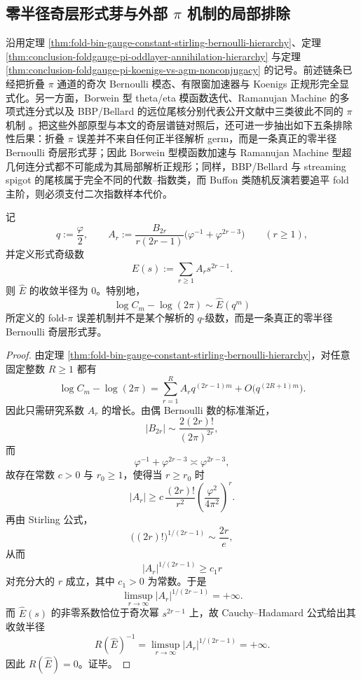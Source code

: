 \subsection{零半径奇层形式芽与外部 \texorpdfstring{$\pi$}{pi} 机制的局部排除}\label{subsec:conclusion-foldgauge-pi-zero-radius-external-obstruction}
沿用定理 \ref{thm:fold-bin-gauge-constant-stirling-bernoulli-hierarchy}、定理 \ref{thm:conclusion-foldgauge-pi-oddlayer-annihilation-hierarchy} 与定理 \ref{thm:conclusion-foldgauge-pi-koenigs-vs-agm-nonconjugacy} 的记号。前述链条已经把折叠 \(\pi\) 通道的奇次 Bernoulli 模态、有限窗加速器与 Koenigs 正规形完全显式化。另一方面，Borwein 型 theta/eta 模函数迭代、Ramanujan Machine 的多项式连分式以及 BBP/Bellard 的远位尾核分别代表公开文献中三类彼此不同的 \(\pi\) 机制 \cite{BorweinGarvan1997EtaPi,Wang2026RamanujanMachinePi,Bailey2023BBPCompendium}。把这些外部原型与本文的奇层谱链对照后，还可进一步抽出如下五条排除性后果：折叠 \(\pi\) 误差并不来自任何正半径解析 germ，而是一条真正的零半径 Bernoulli 奇层形式芽；因此 Borwein 型模函数加速与 Ramanujan Machine 型超几何连分式都不可能成为其局部解析正规形；同样，BBP/Bellard 与 streaming spigot 的尾核属于完全不同的代数--指数类，而 Buffon 类随机反演若要追平 fold 主阶，则必须支付二次指数样本代价。

\begin{theorem}\label{thm:conclusion-foldgauge-pi-zero-radius-odd-germ}
记
\[
q:=\frac{\varphi}{2},
\qquad
A_r:=\frac{B_{2r}}{r(2r-1)}\bigl(\varphi^{-1}+\varphi^{2r-3}\bigr)
\qquad (r\ge 1),
\]
并定义形式奇级数
\[
\widehat E(s):=\sum_{r\ge 1}A_r s^{2r-1}.
\]
则 \(\widehat E\) 的收敛半径为 \(0\)。特别地，
\[
\log C_m-\log(2\pi)\sim \widehat E(q^m)
\]
所定义的 fold-\(\pi\) 误差机制并不是某个解析的 \(q\)-级数，而是一条真正的零半径 Bernoulli 奇层形式芽。
\end{theorem}
\begin{proof}
由定理 \ref{thm:fold-bin-gauge-constant-stirling-bernoulli-hierarchy}，对任意固定整数 \(R\ge 1\) 都有
\[
\log C_m-\log(2\pi)
=
\sum_{r=1}^{R}A_r q^{(2r-1)m}
+O\!\bigl(q^{(2R+1)m}\bigr).
\]
因此只需研究系数 \(A_r\) 的增长。由偶 Bernoulli 数的标准渐近，
\[
|B_{2r}|
\sim
\frac{2(2r)!}{(2\pi)^{2r}},
\]
而
\[
\varphi^{-1}+\varphi^{2r-3}\asymp \varphi^{2r-3},
\]
故存在常数 \(c>0\) 与 \(r_0\ge 1\)，使得当 \(r\ge r_0\) 时
\[
|A_r|
\ge
c\,
\frac{(2r)!}{r^2}
\left(\frac{\varphi^2}{4\pi^2}\right)^r.
\]
再由 Stirling 公式，
\[
\bigl((2r)!\bigr)^{1/(2r-1)}
\sim
\frac{2r}{e},
\]
从而
\[
|A_r|^{1/(2r-1)}\ge c_1 r
\]
对充分大的 \(r\) 成立，其中 \(c_1>0\) 为常数。于是
\[
\limsup_{r\to\infty}|A_r|^{1/(2r-1)}=+\infty.
\]
而 \(\widehat E(s)\) 的非零系数恰位于奇次幂 \(s^{2r-1}\) 上，故 Cauchy--Hadamard 公式给出其收敛半径
\[
R(\widehat E)^{-1}
=
\limsup_{r\to\infty}|A_r|^{1/(2r-1)}
=+\infty.
\]
因此 \(R(\widehat E)=0\)。证毕。
\end{proof}

